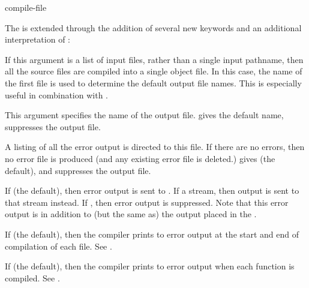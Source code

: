 \begin{defun}{}{compile-file}{
    }
  
  The \cmucl{}  is extended through the addition of
  several new keywords and an additional interpretation of
  :
  \begin{Lentry}
    
  \item[\var{input-pathname}] If this argument is a list of input
    files, rather than a single input pathname, then all the source
    files are compiled into a single object file.  In this case, the
    name of the first file is used to determine the default output
    file names.  This is especially useful in combination with
    .
    
  \item[\kwd{output-file}] This argument specifies the name of the
    output file.  \true{} gives the default name, \false{} suppresses
    the output file.
    
  \item[\kwd{error-file}] A listing of all the error output is
    directed to this file.  If there are no errors, then no error file
    is produced (and any existing error file is deleted.)  \true{}
    gives  (the default), and \false{}
    suppresses the output file.
    
  \item[\kwd{error-output}] If \true{} (the default), then error
    output is sent to .  If a stream, then output
    is sent to that stream instead.  If \false, then error output is
    suppressed.  Note that this error output is in addition to (but
    the same as) the output placed in the .
    
  \item[\kwd{verbose}] If \true{} (the default), then the compiler
    prints to error output at the start and end of compilation of each
    file.  See .
    
  \item[\kwd{print}] If \true{} (the default), then the compiler
    prints to error output when each function is compiled.  See
    .
    

\end{Lentry}
\end{defun}
